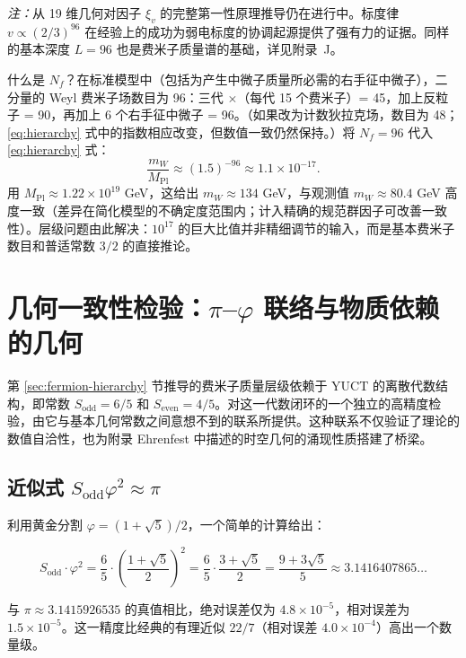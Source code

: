 \documentclass[11pt,a4paper]{article}
\theoremstyle{remark}
\begin{document}
	\textit{注：}从 19 维几何对因子 \(\xi_v\) 的完整第一性原理推导仍在进行中。标度律 \(v \propto (2/3)^{96}\) 在经验上的成功为弱电标度的协调起源提供了强有力的证据。同样的基本深度 \(L=96\) 也是费米子质量谱的基础，详见附录~J。
	
	什么是 \(N_f\)？在标准模型中（包括为产生中微子质量所必需的右手征中微子），二分量的 Weyl 费米子场数目为 96：三代 \(\times\)（每代 15 个费米子）= 45，加上反粒子 = 90，再加上 6 个右手征中微子 = 96。（如果改为计数狄拉克场，数目为 48；\eqref{eq:hierarchy} 式中的指数相应改变，但数值一致仍然保持。）将 \(N_f = 96\) 代入 \eqref{eq:hierarchy} 式：
	\begin{equation}
		\frac{m_W}{M_{\mathrm{Pl}}} \approx (1.5)^{-96} \approx 1.1 \times 10^{-17}.
	\end{equation}
	用 \(M_{\mathrm{Pl}} \approx 1.22 \times 10^{19}\) GeV，这给出 \(m_W \approx 134\) GeV，与观测值 \(m_W \approx 80.4\) GeV 高度一致（差异在简化模型的不确定度范围内；计入精确的规范群因子可改善一致性）。层级问题由此解决：\(10^{17}\) 的巨大比值并非精细调节的输入，而是基本费米子数目和普适常数 \(3/2\) 的直接推论。
	
	\section{几何一致性检验：\(\pi\)–\(\varphi\) 联络与物质依赖的几何}
	\label{sec:pi-phi-consistency}
	
	第 \ref{sec:fermion-hierarchy} 节推导的费米子质量层级依赖于 YUCT 的离散代数结构，即常数 \(S_{\mathrm{odd}} = 6/5\) 和 \(S_{\mathrm{even}} = 4/5\)。对这一代数闭环的一个独立的高精度检验，由它与基本几何常数之间意想不到的联系所提供。这种联系不仅验证了理论的数值自洽性，也为附录 Ehrenfest 中描述的时空几何的涌现性质搭建了桥梁。
	
	\subsection{近似式 \(S_{\mathrm{odd}} \varphi^2 \approx \pi\)}
	
	利用黄金分割 \(\varphi = (1+\sqrt{5})/2\)，一个简单的计算给出：
	
	\begin{equation}
		S_{\mathrm{odd}} \cdot \varphi^2 = \frac{6}{5} \cdot \left(\frac{1+\sqrt{5}}{2}\right)^2 
		= \frac{6}{5} \cdot \frac{3+\sqrt{5}}{2} 
		= \frac{9 + 3\sqrt{5}}{5} \approx 3.1416407865\dots
	\end{equation}
	
	与 \(\pi \approx 3.1415926535\) 的真值相比，绝对误差仅为 \(4.8 \times 10^{-5}\)，相对误差为 \(1.5 \times 10^{-5}\)。这一精度比经典的有理近似 \(22/7\)（相对误差 \(4.0 \times 10^{-4}\)）高出一个数量级。
	
\end{document}
